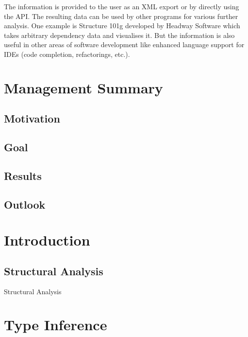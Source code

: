 \documentclass[12pt,halfparskip,DIV11,BCOR10mm]{scrreprt}
\begin{document}
The information is provided to the user as an XML export or by directly using the API. The resulting data can be used by other programs for various further analysis. One example is Structure 101g developed by Headway Software which takes arbitrary dependency data and visualises it. But the information is also useful in other areas of software development like enhanced language support for IDEs (code completion, refactorings, etc.).


\chapter*{Management Summary}

\section*{Motivation}

\section*{Goal}

\section*{Results}

\section*{Outlook}


\newpage

\tableofcontents

\newpage
{}
\pagestyle{scrheadings}

\chapter{Introduction}

\section{Structural Analysis}

Structural Analysis

\chapter{Type Inference}
\end{document}
